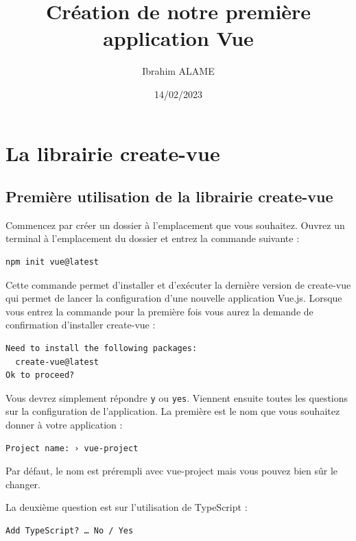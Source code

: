 \documentclass{article}
\title{Création de notre première application Vue}
\author{Ibrahim ALAME}
\date{14/02/2023}
\begin{document}
\maketitle

\section{La librairie create-vue}
\subsection{Première utilisation de la librairie {\color{monOrange} create-vue}}
Commencez par créer un dossier à l'emplacement que vous souhaitez. Ouvrez un terminal à l'emplacement du dossier et entrez la commande suivante :
\begin{verbatim}
npm init vue@latest
\end{verbatim}

Cette commande permet d'installer et d'exécuter la dernière version de {\color{monOrange}create-vue} qui permet de lancer la configuration d'une nouvelle application {\color{monOrange} Vue.js}. Lorsque vous entrez la commande pour la première fois vous aurez la demande de confirmation d'installer {\color{monOrange}create-vue }:
\begin{verbatim}
Need to install the following packages:
  create-vue@latest
Ok to proceed?
\end{verbatim}

Vous devrez simplement répondre {\tt y} ou {\tt yes}. Viennent ensuite toutes les questions sur la configuration de l'application. La première est le nom que vous souhaitez donner à votre application :
\begin{verbatim}
Project name: › vue-project
\end{verbatim}

Par défaut, le nom est prérempli avec vue-project mais vous pouvez bien sûr le changer.

La deuxième question est sur l'utilisation de TypeScript :
\begin{verbatim}
Add TypeScript? … No / Yes
\end{verbatim}
\end{document}
